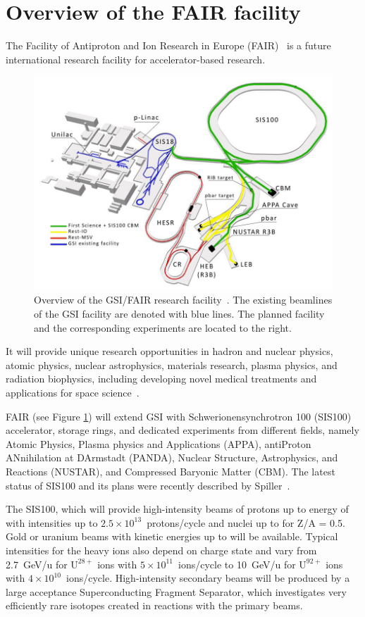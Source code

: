 \section{Overview of the FAIR facility}
The Facility of Antiproton and Ion Research in Europe (\gls{FAIR})~\cite{fair} is a future international research facility for accelerator-based research. 

\begin{figure}[!h]
    \centering
    \includegraphics[width=0.85\columnwidth]{Chapter1/images/fair2.png}
    \caption{Overview of the GSI/FAIR research facility~\cite{fair}. The existing beamlines of the \gls{GSI} facility are denoted with blue lines. The planned facility and the corresponding experiments are located to the right.}
    \label{fig:fair}
\end{figure}

It will provide unique research opportunities in hadron and nuclear physics, atomic physics, nuclear astrophysics, materials research, plasma physics, and radiation biophysics, including developing novel medical treatments and applications for space science~\cite{fair1}. 
 
FAIR (see Figure \ref{fig:fair}) will extend GSI with Schwerionensynchrotron 100 (SIS100) accelerator, storage rings, and dedicated experiments from different fields, namely Atomic Physics, Plasma physics and Applications (APPA), antiProton ANnihilation at DArmstadt (PANDA), Nuclear Structure, Astrophysics, and Reactions (NUSTAR), and Compressed Baryonic Matter (\gls{CBM}). The latest status of SIS100 and its plans were recently described by Spiller~\cite{Spiller_2020}.

The SIS100, which will provide high-intensity beams of protons up
to energy of   with intensities up to $2.5\times 10^{13}$~protons/cycle and nuclei up to  for Z/A = 0.5. Gold or uranium beams with kinetic energies up to  will be available. Typical intensities for the heavy ions also depend on charge state and vary from 2.7~GeV/u for $\mathrm{U^{28+}}$ ions with $5\times 10^{11}$~ions/cycle to 10~GeV/u for $\mathrm{U^{92+}}$ ions with $4\times 10^{10}$~ions/cycle. High-intensity secondary beams will be produced by a large acceptance Superconducting Fragment Separator, which investigates very efficiently rare isotopes created in reactions with the primary beams. 

